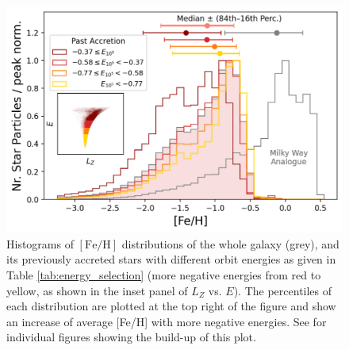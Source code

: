\documentclass[fleqn,usenatbib]{mnras}
\begin{document}
\begin{table}
    \centering
    \renewcommand{\arraystretch}{1.25}
    \caption{Iron abundances [Fe/H] and stellar masses $M_\bigstar$ for the four energy-selected zones of previously accreted stars defined in Sec.~\ref{sec:analysis_chemodynamic_memory}. Median [Fe/H] values with $16^\mathrm{th}$–$84^\mathrm{th}$ percentiles are shown in Fig.~\ref{fig:fe_h_histograms}. Three logarithmic stellar masses (discussed in Sec.~\ref{sec:discussion_strategy_finding_gse_members}) are indicated: the total mass of the selected star particles ($\Sigma$), and the inferred masses from the reversed mass–metallicity relations of \citet[][Eq.~\ref{eq:naidu}]{Naidu2022b} and \citet[][Eq.~\ref{eq:kirby}]{Kirby2013} \href{https://github.com/svenbuder/golden_thread_I/tree/main/figures}{\faGithub}.}
    
    \label{tab:energy_selection}
    \renewcommand{\arraystretch}{1.0}
\end{table}

\begin{figure}
    \centering
    \includegraphics[width=0.95\columnwidth]{figures/fe_h_histograms.png}
    \caption{Histograms of ${\mathrm{[Fe/H]}}$ distributions of the whole galaxy (grey), and its previously accreted stars with different orbit energies as given in Table \ref{tab:energy_selection} (more negative energies from red to yellow, as shown in the inset panel of $L_Z$ vs. $E$). The percentiles of each distribution are plotted at the top right of the figure and show an increase of average [Fe/H] with more negative energies. See \href{https://github.com/svenbuder/golden_thread_I/tree/main/figures}{\faGithub} for individual figures showing the build-up of this plot.}
    \label{fig:fe_h_histograms}
\end{figure}
\end{document}
